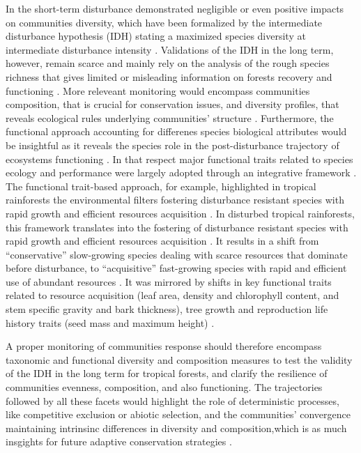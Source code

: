 \documentclass[fleqn,10pt]{ArtEcoFoG} %
\theoremstyle{definition}
\theoremstyle{definition}
\theoremstyle{definition}
\theoremstyle{remark}
\begin{document}
In the short-term disturbance demonstrated negligible or even positive
impacts on communities diversity, which have been formalized by the
intermediate disturbance hypothesis (IDH) stating a maximized species
diversity at intermediate disturbance intensity
\citep{Molino2001, Kariuki2006a, Berry2008a}. Validations of the IDH in
the long term, however, remain scarce and mainly rely on the analysis of
the rough species richness that gives limited or misleading information
on forests recovery and functioning \citep{Martin2015, Chaudhary2016}.
More releveant monitoring would encompass communities composition, that
is crucial for conservation issues, and diversity profiles, that reveals
ecological rules underlying communities' structure
\citep{Magurran1988, Lavorel2002, Bellwood2006}. Furthermore, the
functional approach accounting for differenes species biological
attributes would be insightful as it reveals the species role in the
post-disturbance trajectory of ecosystems functioning
\citep{Violle2007b, Moretti2009, Baraloto2012a, Scheiter2013}. In that
respect major functional traits related to species ecology and
performance were largely adopted through an integrative framework
\citep{Diaz2005, Villeger2008a}. The functional trait-based approach,
for example, highlighted in tropical rainforests the environmental
filters fostering disturbance resistant species with rapid growth and
efficient resources acquisition \citep{Molino2001, Haddad2008}. In
disturbed tropical rainforests, this framework translates into the
fostering of disturbance resistant species with rapid growth and
efficient resources acquisition \citep{Molino2001, Haddad2008}. It
results in a shift from ``conservative'' slow-growing species dealing
with scarce resources that dominate before disturbance, to
``acquisitive'' fast-growing species with rapid and efficient use of
abundant resources \citep{TerSteege2001, Reich2014, Herault2011}. It was
mirrored by shifts in key functional traits related to resource
acquisition (leaf area, density and chlorophyll content, and stem
specific gravity and bark thickness), tree growth and reproduction life
history traits (seed mass and maximum height)
\citep{Wright2004, Westoby2006a, Chave2009b}.

A proper monitoring of communities response should therefore encompass
taxonomic and functional diversity and composition measures to test the
validity of the IDH in the long term for tropical forests, and clarify
the resilience of communities evenness, composition, and also
functioning. The trajectories followed by all these facets would
highlight the role of deterministic processes, like competitive
exclusion or abiotic selection, and the communities' convergence
maintaining intrinsinc differences in diversity and composition,which is
as much insgights for future adaptive conservation strategies
\citep{Adler2007}.
\end{document}
